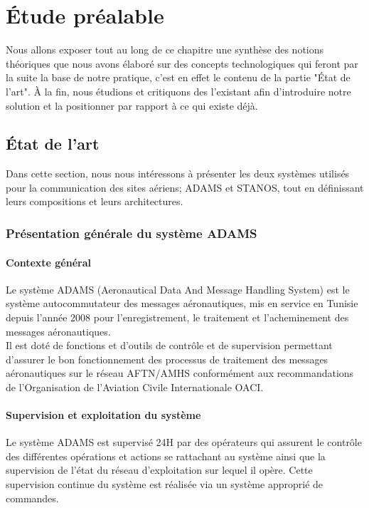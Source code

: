 \chapter{Étude préalable}

Nous allons exposer tout au long de ce chapitre une synthèse des notions théoriques que nous avons élaboré sur des concepts technologiques qui feront par la suite la base de notre pratique, c'est en effet le contenu de la partie "État de l'art".
À la fin, nous étudions et critiquons des l'existant afin d’introduire notre solution et la positionner par rapport à ce qui existe déjà. \\

\section{État de l'art}
Dans cette section, nous nous intéressons à présenter les deux systèmes utilisés pour la communication des sites aériens; ADAMS et STANOS, tout en définissant leurs compositions et leurs architectures. 
\subsection{Présentation générale du système ADAMS}
\subsubsection{Contexte général}
Le système ADAMS  (Aeronautical Data And Message Handling System) est le système autocommutateur des messages aéronautiques, mis en service en Tunisie depuis l’année 2008  pour l’enregistrement, le traitement et l’acheminement des messages aéronautiques. \\

Il est doté de fonctions et d’outils de contrôle et de supervision permettant d’assurer le bon fonctionnement  des processus de traitement des messages aéronautiques sur le réseau AFTN/AMHS conformément aux recommandations de l’Organisation de l’Aviation Civile Internationale OACI.

\subsubsection{Supervision et exploitation du système}

Le système ADAMS est supervisé 24H par des opérateurs qui assurent le contrôle des différentes opérations et actions se rattachant au système ainsi que la supervision de l’état du réseau d’exploitation sur lequel il opère. Cette supervision continue du système est réalisée  via un système approprié de commandes.\\

